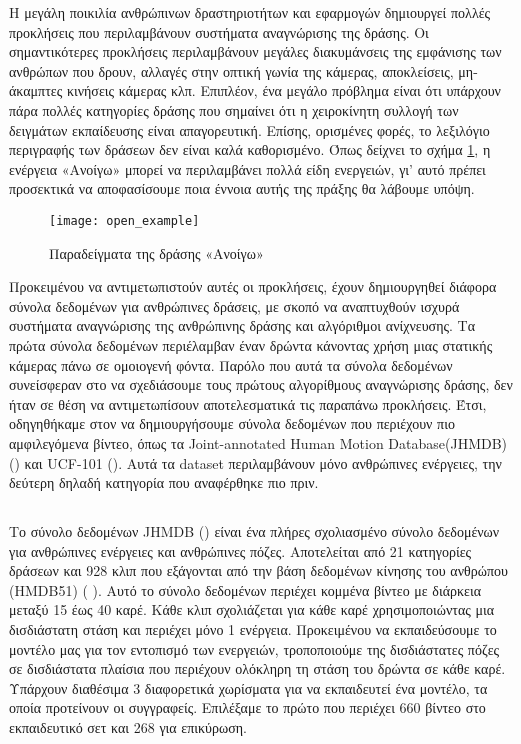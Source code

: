 Η μεγάλη ποικιλία ανθρώπινων δραστηριοτήτων και εφαρμογών δημιουργεί πολλές προκλήσεις που περιλαμβάνουν συστήματα αναγνώρισης της δράσης.
Οι σημαντικότερες προκλήσεις περιλαμβάνουν μεγάλες διακυμάνσεις της εμφάνισης των ανθρώπων που δρουν, αλλαγές στην οπτική γωνία της κάμερας, αποκλείσεις,
μη-άκαμπτες κινήσεις κάμερας κλπ. Επιπλέον, ένα μεγάλο πρόβλημα είναι ότι υπάρχουν πάρα πολλές κατηγορίες δράσης που σημαίνει
ότι η χειροκίνητη συλλογή των δειγμάτων εκπαίδευσης είναι απαγορευτική. Επίσης, ορισμένες φορές, το λεξιλόγιο περιγραφής των δράσεων δεν είναι καλά καθορισμένο.
Όπως δείχνει το σχήμα \ref{fig:gr_open_example}, η ενέργεια «Ανοίγω» μπορεί να περιλαμβάνει πολλά είδη ενεργειών, γι' αυτό πρέπει προσεκτικά
να αποφασίσουμε ποια έννοια αυτής της πράξης θα λάβουμε υπόψη.

\begin{figure}[h]
  \centering
  \texttt{[image: open\_example]}
  \caption{Παραδείγματα της δράσης «Ανοίγω»}
  \label{fig:gr_open_example}

\end{figure}

Προκειμένου να αντιμετωπιστούν αυτές οι προκλήσεις, έχουν δημιουργηθεί διάφορα σύνολα δεδομένων για ανθρώπινες δράσεις, με σκοπό να αναπτυχθούν
ισχυρά συστήματα αναγνώρισης της ανθρώπινης δράσης και αλγόριθμοι ανίχνευσης.
Τα πρώτα σύνολα δεδομένων περιέλαμβαν έναν δρώντα κάνοντας χρήση μιας στατικής κάμερας πάνω σε ομοιογενή φόντα.
Παρόλο που αυτά τα σύνολα δεδομένων συνείσφεραν στο να σχεδιάσουμε τους πρώτους αλγορίθμους αναγνώρισης δράσης, δεν ήταν σε θέση να αντιμετωπίσουν αποτελεσματικά τις παραπάνω
προκλήσεις.
Έτσι,  οδηγηθήκαμε στον να δημιουργήσουμε σύνολα δεδομένων που περιέχουν πιο αμφιλεγόμενα βίντεο, όπως τα \en Joint-annotated Human Motion Database(JHMDB) (\cite{Jhuang:ICCV:2013}) \gr 
και \en UCF-101 (\cite{soomro2012ucf101})\gr. Αυτά τα \en dataset \gr περιλαμβάνουν μόνο ανθρώπινες ενέργειες, την δεύτερη δηλαδή κατηγορία που αναφέρθηκε πιο πριν.

\subsection{}
Το σύνολο δεδομένων \en JHMDB (\cite{Jhuang:ICCV:2013}) \gr είναι ένα πλήρες σχολιασμένο σύνολο δεδομένων για ανθρώπινες ενέργειες και ανθρώπινες πόζες. Αποτελείται από 21 κατηγορίες δράσεων
και 928 κλιπ που εξάγονται από την βάση δεδομένων κίνησης του ανθρώπου \en (HMDB51) ( \cite{Kuehne11})\gr. Αυτό το σύνολο δεδομένων περιέχει κομμένα βίντεο με διάρκεια μεταξύ
15 έως 40 καρέ. Κάθε κλιπ σχολιάζεται για κάθε καρέ χρησιμοποιώντας μια δισδιάστατη στάση και περιέχει μόνο 1 ενέργεια.
Προκειμένου να εκπαιδεύσουμε το μοντέλο μας για τον εντοπισμό των ενεργειών, τροποποιούμε της δισδιάστατες πόζες σε δισδιάστατα πλαίσια που περιέχουν ολόκληρη τη στάση του δρώντα σε κάθε καρέ.
Υπάρχουν διαθέσιμα 3 διαφορετικά χωρίσματα για να εκπαιδευτεί ένα μοντέλο, τα οποία προτείνουν οι συγγραφείς. Επιλέξαμε το πρώτο  που περιέχει 660
βίντεο στο εκπαιδευτικό σετ και 268 για επικύρωση.

